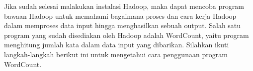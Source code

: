 \documentclass[a4paper]{tufte-handout}
\begin{document}
\clearpage
{}


Jika sudah selesai malakukan instalasi Hadoop, maka dapat mencoba program bawaan Hadoop untuk memahami bagaimana proses dan cara kerja Hadoop dalam memproses data input hingga menghasilkan sebuah output. Salah satu program yang sudah disediakan oleh Hadoop adalah WordCount, yaitu program menghitung jumlah kata dalam data input yang dibarikan. Silahkan ikuti langkah-langkah berikut ini untuk mengetahui cara penggunaan program WordCount.
\end{document}
